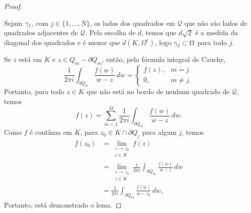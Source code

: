 \begin{proof}
\begin{figure}[H]
        	\label{fig:reticulado runge}
        \end{figure}
        Sejam $\gamma_j$, com $j \in \{1, \dots, N\}$, os lados dos quadrados em $\mathcal{Q}$ 
        que não são lados de quadrados adjacentes de $\mathcal{Q}$. Pela escolha de $d$, temos 
        que $d\sqrt{2}$ é a medida da diagonal dos quadrados e é menor que $d(K, \Omega^c)$, 
        logo $\gamma_j\subset\Omega$ para todo $j$.
        
        Se $z$ está em $K$ e $z \in Q_m - \partial Q_m$, então, pela fórmula integral de Cauchy,
        \begin{equation*}
            \frac{1}{2 \pi i}\int_{\partial Q_m}\frac{f(w)}{w-z}\, dw 
            = 
            \begin{cases}
                f(z), &m = j \\
                0, &m \neq j.
            \end{cases}
        \end{equation*}
        Portanto, para todo $z\in K$ que não está no bordo de nenhum quadrado de $\mathcal{Q}$, 
        temos
        \begin{equation*}
            f(z) = \sum^{M}_{m=1}\frac{1}{2 \pi i}\int_{\partial Q_m}\frac{f(w)}{w-z}\,dw.
        \end{equation*}
        Como $f$ é contínua em $K$, para $z_0 \in K \cap \partial Q_j$ para algum $j$, temos
        \begin{align*}
            f(z_0) &= \lim_{\substack{z \to z_0 \\ z\in K}} f(z) \\
                   &= \lim_{\substack{z \to z_0 \\ z\in K}} 
                   \frac{1}{2 \pi i}\int_{\partial Q_m}\frac{f(w)}{w-z}\,dw \\
                   &= \frac{1}{2 \pi i}\int_{\partial Q_m}\frac{f(w)}{w-z_0}\,dw,
        \end{align*}
        Portanto, está demonstrado o lema.
    \end{proof}
